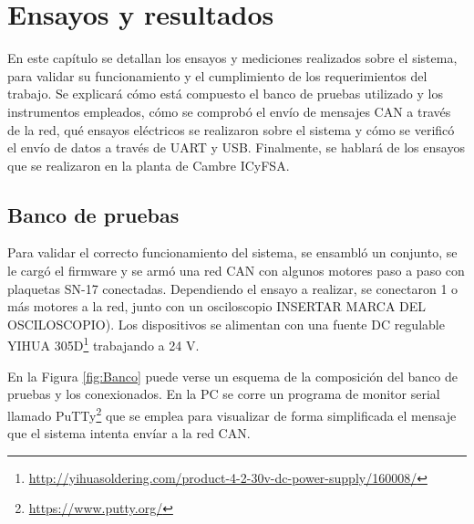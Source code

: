 
\chapter{Ensayos y resultados} %

\label{Chapter4} %

En este capítulo se detallan los ensayos y mediciones realizados sobre el sistema, para validar su funcionamiento y el cumplimiento de los requerimientos del trabajo. Se explicará cómo está compuesto el banco de pruebas utilizado y los instrumentos empleados, cómo se comprobó el envío de mensajes CAN a través de la red, qué ensayos eléctricos se realizaron sobre el sistema y cómo se verificó el envío de datos a través de UART y USB. Finalmente, se hablará de los ensayos que se realizaron en la planta de Cambre ICyFSA. 


\section{Banco de pruebas}

Para validar el correcto funcionamiento del sistema, se ensambló un conjunto, se le cargó el firmware y se armó una red CAN con algunos motores paso a paso con plaquetas SN-17 conectadas. Dependiendo el ensayo a realizar, se conectaron 1 o más motores a la red, junto con un osciloscopio INSERTAR MARCA DEL OSCILOSCOPIO). Los dispositivos se alimentan con una fuente DC regulable YIHUA 305D\footnote{\url{http://yihuasoldering.com/product-4-2-30v-dc-power-supply/160008/}} trabajando a 24 V.

En la Figura \ref{fig:Banco} puede verse un esquema de la composición del banco de pruebas y los conexionados. En la PC se corre un programa de monitor serial llamado PuTTy\footnote{\url{https://www.putty.org/}} que se emplea para visualizar de forma simplificada el mensaje que el sistema intenta envíar a la red CAN.

